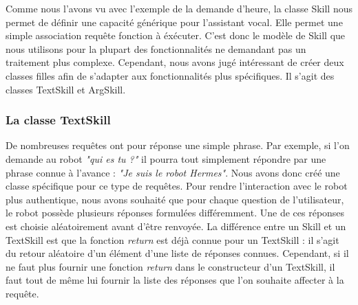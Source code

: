 \documentclass[a4paper,10pt]{report}
\begin{document}
          {Comme nous l'avons vu avec l'exemple de la demande d'heure, la classe Skill nous permet de définir une capacité générique pour l'assistant vocal. Elle permet une simple association requête \textrightarrow \space fonction à éxécuter. C'est donc le modèle de Skill que nous utilisons pour la plupart des fonctionnalités ne demandant pas un traitement plus complexe.}
          {Cependant, nous avons jugé intéressant de créer deux classes filles afin de s'adapter aux fonctionnalités plus spécifiques. Il s'agit des classes TextSkill et ArgSkill.}
        \subsubsection{La classe TextSkill}
          {De nombreuses requêtes ont pour réponse une simple phrase. Par exemple, si l'on demande au robot \textit{"qui es tu ?"} il pourra tout simplement répondre par une phrase connue à l'avance : \textit{"Je suis le robot Hermes"}. Nous avons donc créé une classe spécifique pour ce type de requêtes.\newline}
          {Pour rendre l'interaction avec le robot plus authentique, nous avons souhaité que pour chaque question de l'utilisateur, le robot possède plusieurs réponses formulées différemment. Une de ces réponses est choisie aléatoirement avant d'être renvoyée.\newline}
          {La différence entre un Skill et un TextSkill est que la fonction \textit{return} est déjà connue pour un TextSkill : il s'agit du retour aléatoire d'un élément d'une liste de réponses connues. Cependant, si il ne faut plus fournir une fonction \textit{return} dans le constructeur d'un TextSkill, il faut tout de même lui fournir la liste des réponses que l'on souhaite affecter à la requête.}
\end{document}
